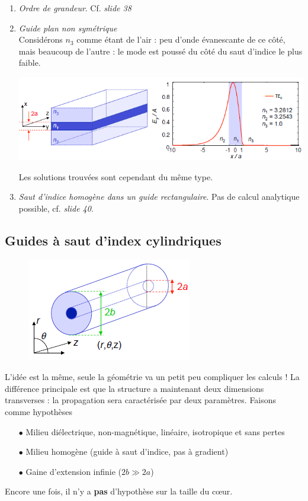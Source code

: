 \begin{enumerate}
\item \textit{Ordre de grandeur}. Cf. \textit{slide 38}
\item \textit{Guide plan non symétrique}\\
Considérons $n_3$ comme étant de l'air : peu d'onde évanescante de ce côté, mais beaucoup de l'autre :
le mode est poussé du côté du saut d'indice le plus faible.
\begin{center}
	\includegraphics[scale=0.75]{ch1/image19}
\end{center}
 Les solutions trouvées sont cependant
du même type.
\item \textit{Saut d'indice homogène dans un guide rectangulaire}. Pas de calcul analytique possible,
cf. \textit{slide 40}.
\end{enumerate}

\subsection{Guides à saut d'index cylindriques}
	\begin{figure}
	\vspace{-5mm}
	\includegraphics[scale=0.75]{ch1/image20}
	\end{figure}
L'idée est la même, seule la géométrie va un petit peu compliquer les calculs ! La différence 
principale est que la structure a maintenant deux dimensions transverses : la propagation sera
caractérisée par deux paramètres. Faisons comme 
hypothèses
\begin{itemize}
\item[$\bullet$] Milieu diélectrique, non-magnétique, linéaire, isotropique et sans pertes
\item[$\bullet$] Milieu homogène (guide à saut d'indice, pas à gradient)
\item[$\bullet$] Gaine d'extension infinie ($2b\gg 2a$)
\end{itemize}
Encore une fois, il n'y a \textbf{pas} d'hypothèse sur la taille du cœur. \\

